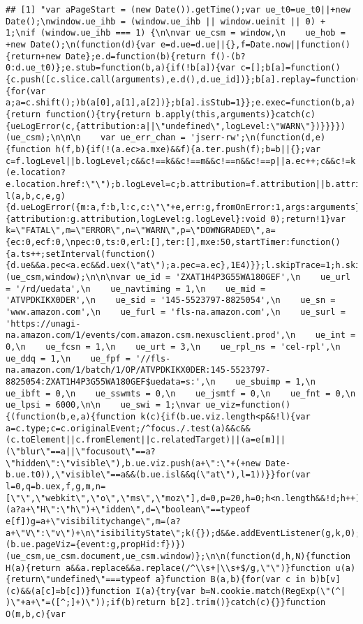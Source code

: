 \documentclass[
]{article}
\begin{document}
\begin{verbatim}
## [1] "var aPageStart = (new Date()).getTime();var ue_t0=ue_t0||+new Date();\nwindow.ue_ihb = (window.ue_ihb || window.ueinit || 0) + 1;\nif (window.ue_ihb === 1) {\n\nvar ue_csm = window,\n    ue_hob = +new Date();\n(function(d){var e=d.ue=d.ue||{},f=Date.now||function(){return+new Date};e.d=function(b){return f()-(b?0:d.ue_t0)};e.stub=function(b,a){if(!b[a]){var c=[];b[a]=function(){c.push([c.slice.call(arguments),e.d(),d.ue_id])};b[a].replay=function(b){for(var a;a=c.shift();)b(a[0],a[1],a[2])};b[a].isStub=1}};e.exec=function(b,a){return function(){try{return b.apply(this,arguments)}catch(c){ueLogError(c,{attribution:a||\"undefined\",logLevel:\"WARN\"})}}}})(ue_csm);\n\n\n    var ue_err_chan = 'jserr-rw';\n(function(d,e){function h(f,b){if(!(a.ec>a.mxe)&&f){a.ter.push(f);b=b||{};var c=f.logLevel||b.logLevel;c&&c!==k&&c!==m&&c!==n&&c!==p||a.ec++;c&&c!=k||a.ecf++;b.pageURL=\"\"+(e.location?e.location.href:\"\");b.logLevel=c;b.attribution=f.attribution||b.attribution;a.erl.push({ex:f,info:b})}}function l(a,b,c,e,g){d.ueLogError({m:a,f:b,l:c,c:\"\"+e,err:g,fromOnError:1,args:arguments},g?{attribution:g.attribution,logLevel:g.logLevel}:void 0);return!1}var k=\"FATAL\",m=\"ERROR\",n=\"WARN\",p=\"DOWNGRADED\",a={ec:0,ecf:0,\npec:0,ts:0,erl:[],ter:[],mxe:50,startTimer:function(){a.ts++;setInterval(function(){d.ue&&a.pec<a.ec&&d.uex(\"at\");a.pec=a.ec},1E4)}};l.skipTrace=1;h.skipTrace=1;h.isStub=1;d.ueLogError=h;d.ue_err=a;e.onerror=l})(ue_csm,window);\n\n\nvar ue_id = 'ZXAT1H4P3G55WA180GEF',\n    ue_url = '/rd/uedata',\n    ue_navtiming = 1,\n    ue_mid = 'ATVPDKIKX0DER',\n    ue_sid = '145-5523797-8825054',\n    ue_sn = 'www.amazon.com',\n    ue_furl = 'fls-na.amazon.com',\n    ue_surl = 'https://unagi-na.amazon.com/1/events/com.amazon.csm.nexusclient.prod',\n    ue_int = 0,\n    ue_fcsn = 1,\n    ue_urt = 3,\n    ue_rpl_ns = 'cel-rpl',\n    ue_ddq = 1,\n    ue_fpf = '//fls-na.amazon.com/1/batch/1/OP/ATVPDKIKX0DER:145-5523797-8825054:ZXAT1H4P3G55WA180GEF$uedata=s:',\n    ue_sbuimp = 1,\n    ue_ibft = 0,\n    ue_sswmts = 0,\n    ue_jsmtf = 0,\n    ue_fnt = 0,\n    ue_lpsi = 6000,\n\n    ue_swi = 1;\nvar ue_viz=function(){(function(b,e,a){function k(c){if(b.ue.viz.length<p&&!l){var a=c.type;c=c.originalEvent;/^focus./.test(a)&&c&&(c.toElement||c.fromElement||c.relatedTarget)||(a=e[m]||(\"blur\"==a||\"focusout\"==a?\"hidden\":\"visible\"),b.ue.viz.push(a+\":\"+(+new Date-b.ue.t0)),\"visible\"==a&&(b.ue.isl&&q(\"at\"),l=1))}}for(var l=0,q=b.uex,f,g,m,n=[\"\",\"webkit\",\"o\",\"ms\",\"moz\"],d=0,p=20,h=0;h<n.length&&!d;h++)if(a=n[h],f=(a?a+\"H\":\"h\")+\"idden\",d=\"boolean\"==typeof e[f])g=a+\"visibilitychange\",m=(a?a+\"V\":\"v\")+\n\"isibilityState\";k({});d&&e.addEventListener(g,k,0);b.ue&&d&&(b.ue.pageViz={event:g,propHid:f})})(ue_csm,ue_csm.document,ue_csm.window)};\n\n(function(d,h,N){function H(a){return a&&a.replace&&a.replace(/^\\s+|\\s+$/g,\"\")}function u(a){return\"undefined\"===typeof a}function B(a,b){for(var c in b)b[v](c)&&(a[c]=b[c])}function I(a){try{var b=N.cookie.match(RegExp(\"(^| )\"+a+\"=([^;]+)\"));if(b)return b[2].trim()}catch(c){}}function O(m,b,c){var 
\end{verbatim}
\end{document}
